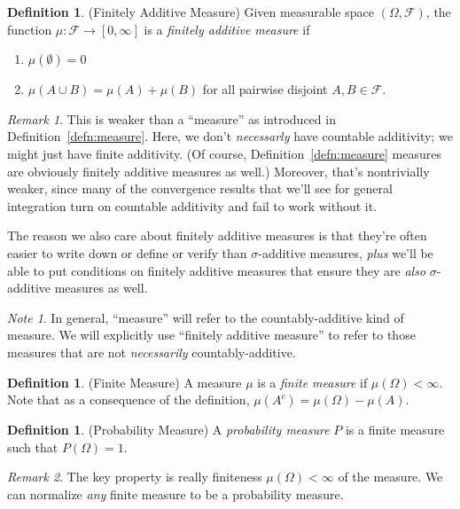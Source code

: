 \documentclass[12pt]{article}
\theoremstyle{plain}
\theoremstyle{definition}
\newtheorem{defn}[thm]{Definition}
\theoremstyle{remark}
\newtheorem*{rmk}{Remark}
\newtheorem*{note}{Note}
\newcommand{\ra}{\rightarrow}
\newcommand{\sF}{\mathscr{F}}
\begin{document}
\begin{defn}(Finitely Additive Measure)
Given measurable space $(\Omega,\sF)$, the function
$\mu:\sF\ra [0,\infty]$ is a \emph{finitely additive measure} if
\begin{enumerate}
  \item $\mu(\emptyset)=0$
  \item $\mu(A\cup B) = \mu(A) + \mu(B)$ for all pairwise disjoint
    $A,B\in\sF$.
\end{enumerate}
\end{defn}
\begin{rmk}
This is weaker than a ``measure'' as introduced in
Definition~\ref{defn:measure}. Here, we don't \emph{necessarly} have
countable additivity; we might just have finite additivity.  (Of course,
Definition~\ref{defn:measure}  measures are obviously finitely additive
measures as well.) Moreover, that's nontrivially weaker, since many of
the convergence results that we'll see for general integration turn on
countable additivity and fail to work without it.

The reason we also care about finitely additive measures is that they're
often easier to write down or define or verify than $\sigma$-additive
measures, \emph{plus} we'll be able to put conditions on finitely
additive measures that ensure they are \emph{also} $\sigma$-additive
measures as well.
\end{rmk}

\begin{note}
In general, ``measure'' will refer to the countably-additive kind of
measure. We will explicitly use ``finitely additive measure'' to refer
to those measures that are not \emph{necessarily} countably-additive.
\end{note}

\begin{defn}(Finite Measure)
A measure $\mu$ is a \emph{finite measure} if $\mu(\Omega)<\infty$.
Note that as a consequence of the definition,
$\mu(A^c) = \mu(\Omega) - \mu(A)$.
\end{defn}

\begin{defn}(Probability Measure)
A \emph{probability measure} $P$ is a finite measure such that
$P(\Omega)=1$.
\end{defn}
\begin{rmk}
The key property is really finiteness $\mu(\Omega)<\infty$ of the
measure. We can normalize \emph{any} finite measure to be a probability
measure.
\end{rmk}
\end{document}
